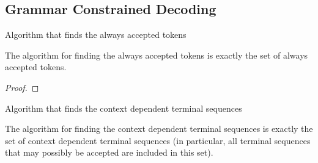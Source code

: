 
\subsection{Grammar Constrained Decoding}

\begin{definition}
    \label{def:FindAlwaysAccepted}
    Algorithm that finds the always accepted tokens
\end{definition}


\begin{lemma}
    \label{lem:FindAlwaysAcceptedCorrect}
    The algorithm for finding the always accepted tokens is exactly the set of always accepted tokens.
\end{lemma}
\begin{proof}
\end{proof}

\begin{definition}
    \label{def:FindContextDependentTerminalSequences}
    Algorithm that finds the context dependent terminal sequences 
\end{definition}

\begin{lemma}
    \label{lem:FindContextDependentCorrect}
    The algorithm for finding the context dependent terminal sequences is exactly the set of context dependent terminal sequences (in particular, all terminal sequences that may possibly be accepted are included in this set).
\end{lemma}

